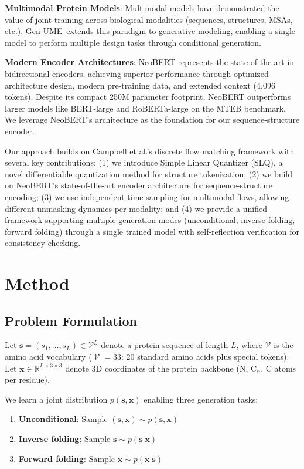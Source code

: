 \documentclass[11pt,a4paper]{article}
\newcommand{\genume}{Gen-UME}
\newcommand{\real}{\mathbb{R}}
\newcommand{\vocab}{\mathcal{V}}
\begin{document}
\textbf{Multimodal Protein Models}: Multimodal models have demonstrated the value of joint training across biological modalities (sequences, structures, MSAs, etc.). \genume~extends this paradigm to generative modeling, enabling a single model to perform multiple design tasks through conditional generation.

\textbf{Modern Encoder Architectures}: NeoBERT \cite{lebreton2025} represents the state-of-the-art in bidirectional encoders, achieving superior performance through optimized architecture design, modern pre-training data, and extended context (4,096 tokens). Despite its compact 250M parameter footprint, NeoBERT outperforms larger models like BERT-large and RoBERTa-large on the MTEB benchmark. We leverage NeoBERT's architecture as the foundation for our sequence-structure encoder.

Our approach builds on Campbell et al.'s discrete flow matching framework with several key contributions: (1) we introduce Simple Linear Quantizer (SLQ), a novel differentiable quantization method for structure tokenization; (2) we build on NeoBERT's state-of-the-art encoder architecture for sequence-structure encoding; (3) we use independent time sampling for multimodal flows, allowing different unmasking dynamics per modality; and (4) we provide a unified framework supporting multiple generation modes (unconditional, inverse folding, forward folding) through a single trained model with self-reflection verification for consistency checking.

\section{Method}

\subsection{Problem Formulation}

Let $\mathbf{s} = (s_1, \ldots, s_L) \in \vocab^L$ denote a protein sequence of length $L$, where $\vocab$ is the amino acid vocabulary ($|\vocab| = 33$: 20 standard amino acids plus special tokens). Let $\mathbf{x} \in \real^{L \times 3 \times 3}$ denote 3D coordinates of the protein backbone (N, C$_\alpha$, C atoms per residue).

We learn a joint distribution $p(\mathbf{s}, \mathbf{x})$ enabling three generation tasks:

\begin{enumerate}
\item \textbf{Unconditional}: Sample $(\mathbf{s}, \mathbf{x}) \sim p(\mathbf{s}, \mathbf{x})$
\item \textbf{Inverse folding}: Sample $\mathbf{s} \sim p(\mathbf{s}|\mathbf{x})$
\item \textbf{Forward folding}: Sample $\mathbf{x} \sim p(\mathbf{x}|\mathbf{s})$
\end{enumerate}
\end{document}
